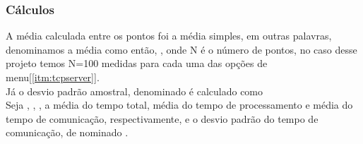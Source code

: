 \documentclass[a4paper,10pt]{article}
\begin{document}
\subsubsection{Cálculos}
A média calculada entre os pontos foi a média simples, em outras palavras, denominamos a 
média como \boxed{\mu} então, , onde N
é o número de pontos, no caso desse projeto temos N=100 medidas para cada uma das opções de menu[\ref{itm:tcpserver}].\\
Já o desvio padrão amostral, denominado \boxed{\sigma} é calculado como \\
Seja , , , a média do tempo total, média do tempo de processamento e média do tempo de comunicação,
respectivamente, e o desvio padrão do tempo de comunicação, de
nominado .
\newpage
\begin{figure}[!htb]
  \centering
\end{figure}
\newpage
\end{document}
